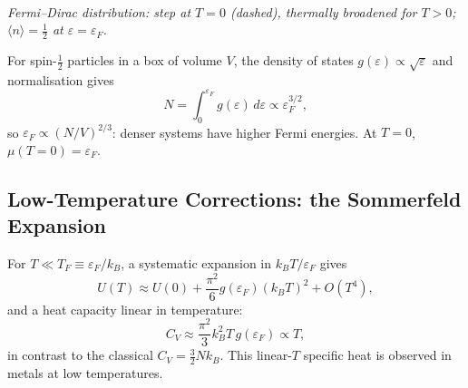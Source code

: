 \begin{center}
\\[3pt]
{\small\itshape Fermi--Dirac distribution: step at $T=0$ (dashed), thermally broadened
for $T>0$; $\langle n\rangle=\tfrac{1}{2}$ at $\varepsilon=\varepsilon_F$.}
\end{center}

For spin-$\tfrac{1}{2}$ particles in a box of volume $V$, the density of
states $g(\varepsilon) \propto \sqrt{\varepsilon}$ and normalisation gives
\begin{equation}
    N = \int_0^{\varepsilon_F} g(\varepsilon)\,d\varepsilon \propto \varepsilon_F^{3/2},
\end{equation}
so $\varepsilon_F \propto (N/V)^{2/3}$: denser systems have higher Fermi energies.
At $T = 0$, $\mu(T=0) = \varepsilon_F$.

\subsection{Low-Temperature Corrections: the Sommerfeld Expansion}

For $T \ll T_F \equiv \varepsilon_F/k_B$, a systematic expansion in $k_BT/\varepsilon_F$
gives
\begin{equation}
    U(T) \approx U(0) + \frac{\pi^2}{6}g(\varepsilon_F)(k_BT)^2 + O(T^4),
\end{equation}
and a heat capacity linear in temperature:
\begin{equation}
    C_V \approx \frac{\pi^2}{3}k_B^2 T\, g(\varepsilon_F) \propto T,
\end{equation}
in contrast to the classical $C_V = \tfrac{3}{2}Nk_B$.  This linear-$T$ specific
heat is observed in metals at low temperatures.

